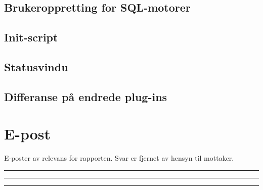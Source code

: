 \documentclass[a4paper,twoside,11pt,pdftex,norsk]{report}
\newenvironment{changemargin}[2]{%
\begin{list}{}{%
\linespread{0.9}%
\setlength{\topsep}{0pt}%
\setlength{\leftmargin}{#1}%
\setlength{\rightmargin}{#2}%
\setlength{\listparindent}{\parindent}%
\setlength{\itemindent}{\parindent}%
\setlength{\parsep}{\parskip}%
}%
\item[]}{\end{list}}
\begin{document}
\begin{appendices}
\begin{changemargin}{-1cm}{-1cm}
\section{Brukeroppretting for SQL-motorer}



\section{Init-script}


\section{Statusvindu}









\clearpage

\clearpage
\section{Differanse på endrede plug-ins}

\end{changemargin}

\chapter{E-post}\label{epost}
E-poster av relevans for rapporten. Svar er fjernet av hensyn til mottaker.
\clearpage

\noindent\rule{\textwidth}{0.4pt}

\noindent\rule{\textwidth}{0.4pt}

\clearpage

\noindent\rule{\textwidth}{0.4pt}
\label{app:maildb}
\clearpage

\clearpage
{}\label{app:xenapi}
\end{appendices}
\end{document}
